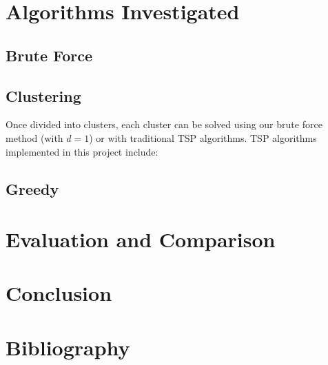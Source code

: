 \documentclass[a4paper,12pt]{article}
\begin{document}
    \pagebreak

    \section{Algorithms Investigated}\label{sec:algorithms-investigated}
    \subsection{Brute Force}\label{subsec:brute-force}

    \subsection{Clustering}\label{subsec:clustering}
    Once divided into clusters, each cluster can be solved using our brute force method (with \(d = 1\)) or with
    traditional TSP algorithms.
    TSP algorithms implemented in this project include:
    \subsection{Greedy}\label{subsec:greedy}

    \pagebreak

    \section{Evaluation and Comparison}\label{sec:evaluation-and-comparison}

    \pagebreak

    \section{Conclusion}\label{sec:conclusion}

    \pagebreak

    \section{Bibliography}\label{sec:bibliography}
\end{document}
